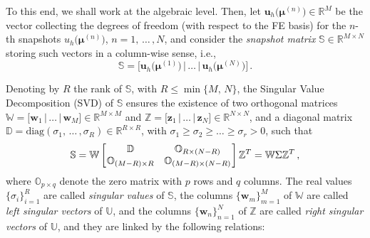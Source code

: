 \documentclass[12pt, a4paper, twoside, openright]{report}
\numberwithin{equation}{chapter}
\theoremstyle{theorem}
\theoremstyle{definition}
\theoremstyle{remark}
\theoremstyle{proposition}
\numberwithin{figure}{chapter}
\newcommand{\bg}[1]{\boldsymbol{#1}}
\begin{document}
		To this end, we shall work at the algebraic level. Then, let $\mathbf{u}_h \big( \bg{\mu}^{(n)} \big) \in \mathbb{R}^M$ be the vector collecting the degrees of freedom (with respect to the FE basis) for the $n$-th snapshots $u_h \big( \bg{\mu}^{(n)} \big)$, $n = 1, \, \ldots \, , N$, and consider the \emph{snapshot matrix} $\mathbb{S} \in \mathbb{R}^{M \times N}$ storing such vectors in a column-wise sense, i.e.,
		\begin{equation*}
			\mathbb{S} = \big[ \mathbf{u}_h \big( \bg{\mu}^{(1)} \big) \, \big| \, \ldots \, \big| \, \mathbf{u}_h \big( \bg{\mu}^{(N)} \big) \big] \, .
		\end{equation*}
		
		Denoting by $R$ the rank of $\mathbb{S}$, with $R \leq \min \big\lbrace{ M, \, N \big\rbrace}$, the Singular Value Decomposition (SVD) of $\mathbb{S}$ ensures the existence of two orthogonal matrices $\mathbb{W} = \big[ \mathbf{w}_1 \, \big| \, \ldots \, \big| \, \mathbf{w}_M \big] \in \mathbb{R}^{M \times M}$ and $\mathbb{Z} = \big[ \mathbf{z}_1 \, \big| \, \ldots \, \big| \, \mathbf{z}_N \big] \in \mathbb{R}^{N \times N}$, and a diagonal matrix $\mathbb{D} = \text{diag}(\sigma_1, \, \ldots \, , \sigma_R) \in \mathbb{R}^{R \times R}$, with $\sigma_1 \geq \sigma_2 \geq \ldots \geq \sigma_r > 0$, such that
		\begin{equation}
			\label{eq:svd}
			\mathbb{S} = \mathbb{W} 
			\begin{bmatrix}
			\hspace*{-0.15cm}
			\begin{array}{cc}
				\mathbb{D} & \mathbb{O}_{R \times (N-R)} \\
				\mathbb{O}_{(M-R) \times R} & \mathbb{O}_{(M-R) \times (N-R)}
			\end{array} 
			\hspace*{-0.15cm}
			\end{bmatrix}
			\mathbb{Z}^T = \mathbb{W} \Sigma \mathbb{Z}^T \, ,
		\end{equation}
		where $\mathbb{O}_{p \times q}$ denote the zero matrix with $p$ rows and $q$ columns. The real values $\big\lbrace \sigma_i \big\rbrace_{i = 1}^R$ are called \emph{singular values} of $\mathbb{S}$, the columns $\big\lbrace \mathbf{w}_m \big\rbrace_{m = 1}^M$ of $\mathbb{W}$ are called \emph{left singular vectors} of $\mathbb{U}$, and the columns $\big\lbrace \mathbf{w}_n \big\rbrace_{n = 1}^N$ of $\mathbb{Z}$ are called \emph{right singular vectors} of $\mathbb{U}$, and they are linked by the following relations:
\end{document}
